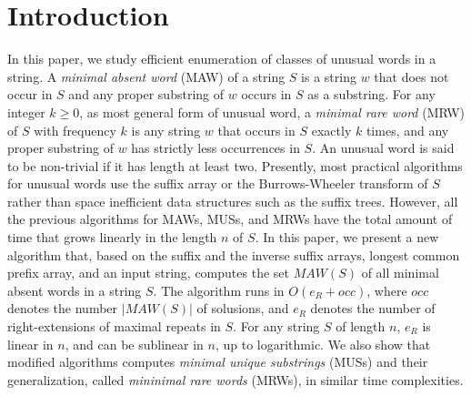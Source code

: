 
\section{Introduction}
\label{sec:intro}

  In this paper, we study efficient enumeration of classes of unusual words in a string.
  A \textit{minimal absent word} (MAW) of a string $S$ is a string $w$ that does not occur in $S$ and any proper substring of $w$ occurs in $S$ as a substring. For any integer $k\ge 0$, as most general form of unusual word, a \textit{minimal rare word} (MRW) of $S$ with frequency $k$ is any string $w$ that occurs in $S$ exactly $k$ times, and any proper substring of $w$ has strictly less occurrences in $S$. An unusual word is said to be non-trivial if it has length at least two.
Presently, most practical algorithms for unusual words use the suffix array or the Burrows-Wheeler transform of $S$ rather than space inefficient data structures such as the suffix trees. However, all the previous algorithms for MAWs, MUSs, and MRWs have the total amount of time that grows linearly in the length $n$ of $S$.
  In this paper, we present a new algorithm that, based on the suffix and the inverse suffix arrays, longest common prefix array, and an input string, computes the set $MAW(S)$ of all minimal absent words in a string $S$. The algorithm runs in $O(e_R + occ)$, where $occ$ denotes the number $|MAW(S)|$ of solusions, and  $e_R$ denotes the number of right-extensions of maximal repeats in $S$. For any string $S$ of length $n$, $e_R$ is linear in $n$, and can be sublinear in $n$, up to logarithmic.
  We also show that modified algorithms computes \textit{minimal unique substrings} (MUSs) and their generalization, called \textit{mininimal rare words} (MRWs), in similar time complexities. 


